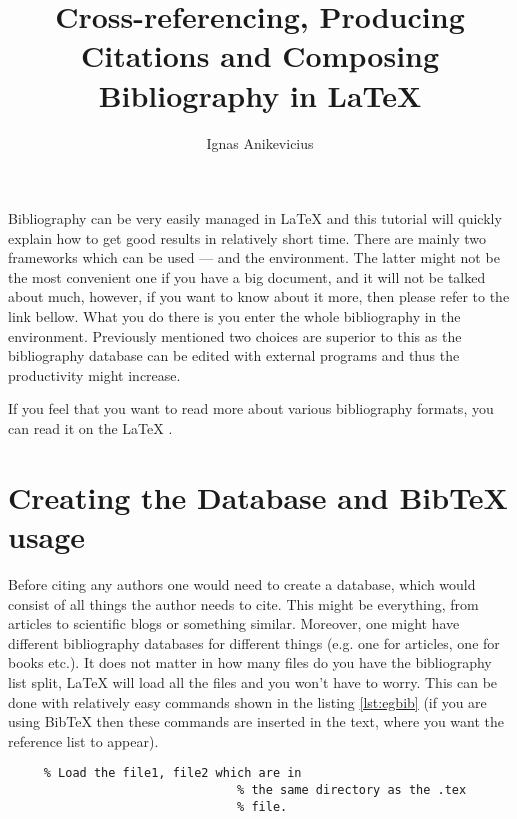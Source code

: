 \documentclass[
]{scrartcl}
\title{Cross-referencing, Producing Citations and Composing Bibliography in \LaTeX{}}
\author{Ignas Anikevicius}
\date{}
\begin{document}
\maketitle
\tableofcontents
\listoftodos{\vskip 1em}

%
Bibliography can be very easily managed in \LaTeX{} and this tutorial will
    quickly explain how to get good results in relatively short time.
%
There are mainly two frameworks which can be used ---  and the
     environment. 
%
The latter might not be the most convenient one if you have a big document, 
    and it will not be talked about much, however, if you want to know about it
    more, then please refer to the link bellow.
%
What you do there is you enter the whole bibliography in the 
    environment.
%
Previously mentioned two choices are superior to this as the bibliography
    database can be edited with external programs and thus the productivity
    might increase.

%
If you feel that you want to read more about various bibliography formats, you
    can read it on the LaTeX
    .\cite{latexwikibook:bibliography}

\section{Creating the Database and Bib\TeX{} usage}

%
Before citing any authors one would need to create a database, which would
    consist of all things the author needs to cite. 
%
This might be everything, from articles to scientific blogs or something
    similar. 
%
Moreover, one might have different bibliography databases for different things
    (e.g. one for articles, one for books etc.). 
%
It does not matter in how many files do you have the bibliography list split,
    \LaTeX{} will load all the files and you won't have to worry. 
%
This can be done with relatively easy commands shown in the listing
    \ref{lst:egbib} (if you are using Bib\TeX{} then these commands are inserted
    in the text, where you want the reference list to appear).
%
\begin{lstlisting}[caption={Example code to get BibTeX working},label=lst:egbib]
       % Load the plain style
     % Load the file1, file2 which are in
                                % the same directory as the .tex
                                % file.
\end{lstlisting}
\end{document}
